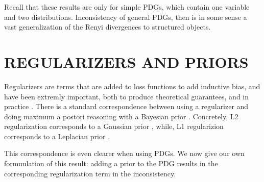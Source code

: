 \documentclass[twoside]{article}
\theoremstyle{plain}
\theoremstyle{definition}
\begin{document}
Recall that these results are only for simple PDGs, which contain one variable and two distributions.
Inconsistency of general PDGs, then is in some sense a vast generalization of the Renyi divergences to structured objects.

\section{REGULARIZERS AND PRIORS}
\label{sec:regularizers}
Regularizers are terms that are added to loss functions to add inductive bias, and have been extremly important, both to produce theoretical guarantees, and in practice \cite{nika_book}.
There is a standard correspondence between using a regularizer and doing maximum a postori reasoning with a Bayesian prior \cite{williams1995bayesian,rennie2003l2,probinterpblogpost,mitcourse}.
Concretely, L2 regularization corresponds to a Gaussian prior \cite{rennie2003l2}, 
while, L1 regularizion corresponds to a Leplacian prior \cite{williams1995bayesian}.

This correspondence is even clearer when using PDGs. We now give our own formuulation of this result: adding a prior to the PDG results in the corresponding regularization term in the inconsistency.
\end{document}
